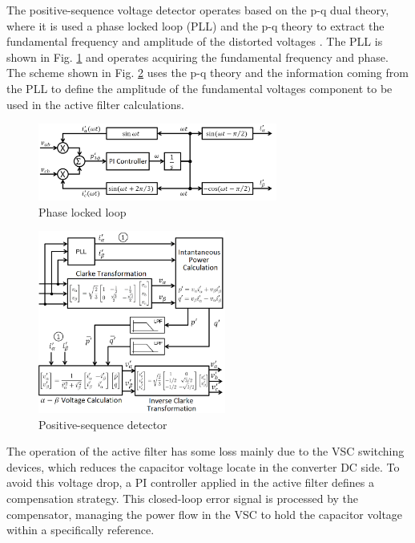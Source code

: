 The positive-sequence voltage detector operates based on the p-q dual theory, where it is used a phase locked loop (PLL) and the p-q theory to extract the fundamental frequency and amplitude of the distorted voltages \citep{Akagi2007}. The PLL is shown in Fig. \ref{fig:PLL.png} and operates acquiring the fundamental frequency and phase. The scheme shown in Fig. \ref{fig:detector_seq_positiva.png} uses the p-q theory and the information coming from the PLL to define the amplitude of the fundamental voltages component to be used in the active filter calculations.


\begin{figure}[!b]
	\centering
	\includegraphics[width=0.70\textwidth]{Figures/PLL.png}
	\caption{Phase locked loop}
	\label{fig:PLL.png}
\end{figure}

\begin{figure}[!b]
	\centering
	\includegraphics[width=0.55\textwidth]{Figures/detector_seq_positiva.png}
	\caption{Positive-sequence detector}
	\label{fig:detector_seq_positiva.png}
\end{figure}

The operation of the active filter has some loss mainly due to the VSC switching devices, which reduces the capacitor voltage locate in the converter DC side. To avoid this voltage drop, a PI controller applied in the active filter defines a compensation strategy. This closed-loop error signal is processed by the compensator, managing the power flow in the VSC to hold the capacitor voltage within a specifically reference.